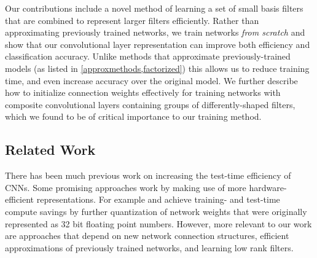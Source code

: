 \documentclass[thesis]{subfiles}
\begin{document}
    
    Our contributions include a novel method of learning a set of small basis filters that are combined to represent larger filters efficiently. Rather than approximating previously trained networks, we train networks \emph{from scratch} and show that our convolutional layer representation can improve both efficiency and classification accuracy. Unlike methods that approximate previously-trained models (as listed in \cref{approxmethods,factorized}) this allows us to reduce training time, and even increase accuracy over the original model. We further describe how to initialize connection weights effectively for training networks with composite convolutional layers containing groups of differently-shaped filters, which we found to be of critical importance to our training method.
    
    \subsection{Related Work}
    \label{relatedwork}
    There has been much previous work on increasing the test-time efficiency of CNNs. Some promising approaches work by making use of more hardware-efficient representations. For example \citet{1502.02551v1} and \citet{vanhoucke2011improving} achieve training- and test-time compute savings by further quantization of network weights that were originally represented as 32 bit floating point numbers. However, more relevant to our work are approaches that depend on new network connection structures, efficient approximations of previously trained networks, and learning low rank filters. 
    
\end{document}

